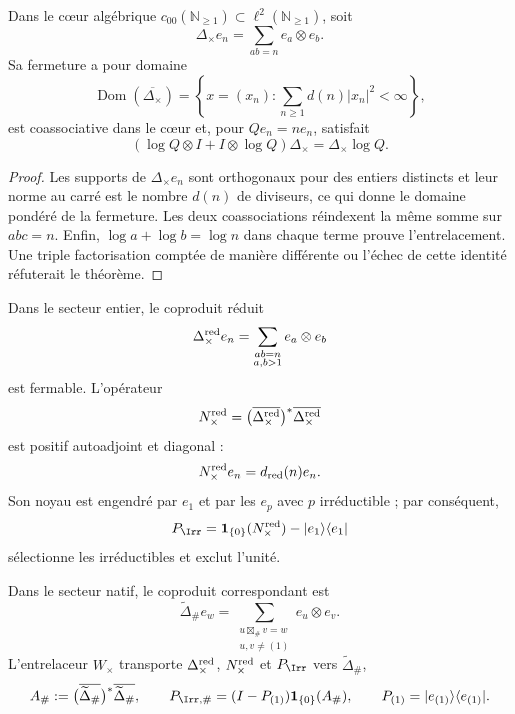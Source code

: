 \begin{theorem}
\label{int:pf84:C06}
Dans le cœur algébrique
\(c_{00}(\mathbb N_{\geq1})\subset\ell^2(\mathbb N_{\geq1})\), soit
\[
 \Delta_\times e_n=\sum_{ab=n}e_a\otimes e_b.
\]
Sa fermeture a pour domaine
\[
 \operatorname{Dom}(\overline{\Delta_\times})
 =
 \left\{x=(x_n):
 \sum_{n\geq1}d(n)|x_n|^2<\infty\right\},
\]
est coassociative dans le cœur et, pour \(Qe_n=ne_n\), satisfait
\[
 (\log Q\otimes I+I\otimes\log Q)\Delta_\times
 =\Delta_\times\log Q.
\]
\end{theorem}

\begin{proof}
Les supports de \(\Delta_\times e_n\) sont orthogonaux pour des entiers distincts
et leur norme au carré est le nombre \(d(n)\) de diviseurs, ce qui donne le domaine
pondéré de la fermeture. Les deux coassociations réindexent la même somme
sur \(abc=n\). Enfin, \(\log a+\log b=\log n\) dans chaque terme
prouve l'entrelacement. Une triple factorisation comptée de manière différente
ou l'échec de cette identité réfuterait le théorème.
\end{proof}

\begin{theorem}
\label{int:pf84:C07}
Dans le secteur entier, le coproduit réduit
\[
 \Delta_\times^{\rm red}e_n
 =\sum_{\substack{ab=n\\a,b>1}}e_a\otimes e_b
\]
est fermable. L'opérateur
\[
 N_\times^{\rm red}
 =\bigl(\overline{\Delta_\times^{\rm red}}\bigr)^*
  \overline{\Delta_\times^{\rm red}}
\]
est positif autoadjoint et diagonal :
\[
 N_\times^{\rm red}e_n=d_{\rm red}(n)e_n.
\]
Son noyau est engendré par \(e_1\) et par les \(e_p\) avec \(p\) irréductible ;
par conséquent,
\[
 P_{\Irr}
 =\mathbf1_{\{0\}}(N_\times^{\rm red})
  -\lvert e_1\rangle\langle e_1\rvert
\]
sélectionne les irréductibles et exclut l'unité.

Dans le secteur natif, le coproduit correspondant est
\[
 \widetilde\Delta_\#e_w
 =\sum_{\substack{u\boxtimes_\#v=w\\u,v\ne(1)}}e_u\otimes e_v.
\]
L'entrelaceur \(W_\times\) transporte
\(\Delta_\times^{\rm red}\), \(N_\times^{\rm red}\) et \(P_{\Irr}\) vers
\(\widetilde\Delta_\#\),
\[
 A_\#:=
 \bigl(\overline{\widetilde\Delta_\#}\bigr)^*
 \overline{\widetilde\Delta_\#},
 \qquad
 P_{\Irr,\#}
 =(I-P_{(1)})\mathbf1_{\{0\}}(A_\#),
 \qquad
 P_{(1)}=\lvert e_{(1)}\rangle\langle e_{(1)}\rvert.
\]
\end{theorem}

